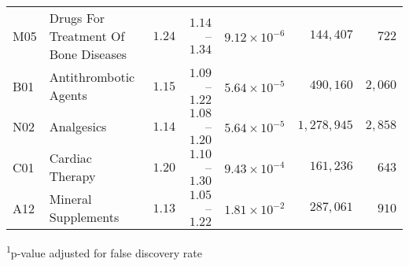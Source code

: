 \begin{longtable}{llrrrrr}
M05 & Drugs For Treatment Of Bone Diseases & $1.24$ & $1.14$–$1.34$ & $9.12 \times 10^{-6}$ & $144,407$ & $722$ \\ 
B01 & Antithrombotic Agents & $1.15$ & $1.09$–$1.22$ & $5.64 \times 10^{-5}$ & $490,160$ & $2,060$ \\ 
N02 & Analgesics & $1.14$ & $1.08$–$1.20$ & $5.64 \times 10^{-5}$ & $1,278,945$ & $2,858$ \\ 
C01 & Cardiac Therapy & $1.20$ & $1.10$–$1.30$ & $9.43 \times 10^{-4}$ & $161,236$ & $643$ \\ 
A12 & Mineral Supplements & $1.13$ & $1.05$–$1.22$ & $1.81 \times 10^{-2}$ & $287,061$ & $910$ \\ 
\bottomrule
\end{longtable}
\begin{minipage}{\linewidth}
\textsuperscript{1}p-value adjusted for false discovery rate\\
\end{minipage}

